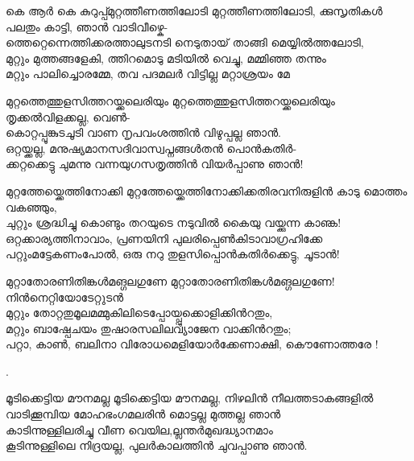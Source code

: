 \begin{enumerate}
\begin{slokam}{\VSr}{കെ ആർ കെ കുറുപ്പ്}{മുറ്റത്തീണത്തിലോടി}
മുറ്റത്തീണത്തിലോടി, ക്കുസൃതികള്‍ പലതും കാട്ടി, ഞാൻ വാടിവീഴ്കെ-\\
ത്തെറ്റെന്നെത്തിക്കരത്താലുടനടി നെടുതായ്‌ താങ്ങി മെയ്യിൽത്തലോടി,\\
മുറ്റും മുത്തങ്ങളേകി, ത്തിറമൊടു മടിയിൽ വെച്ചു, മമ്മിഞ്ഞ തന്നും\\
മറ്റും പാലിച്ചൊരമ്മേ, തവ പദമലർ വിട്ടില്ല മറ്റാശ്രയം മേ
\end{slokam}


\begin{slokam}{\VSv}{\VRV}{മുറ്റത്തെത്തുളസിത്തറയ്ക്കലെരിയും}
മുറ്റത്തെത്തുളസിത്തറയ്ക്കലെരിയും തൃക്കല്‍വിളക്കല്ല, വെണ്‍- \\
കൊറ്റപ്പൂങ്കുടചൂടി വാണ നൃപവംശത്തിന്‍ വിഴുപ്പല്ല ഞാന്‍. \\
ഒറ്റയ്ക്കല്ല, മനുഷ്യമാനസദിവാസ്വപ്നങ്ങള്‍തന്‍ പൊന്‍കതിര്‍- \\
ക്കറ്റക്കെട്ടു ചുമന്നു വന്നയുഗസതൃത്തിന്‍ വിയര്‍പ്പാണു ഞാന്‍! 
\end{slokam}



\begin{slokam}{\VSr}{\HM}{മുറ്റത്തേയ്ക്കെത്തിനോക്കി}
മുറ്റത്തേയ്ക്കെത്തിനോക്കിക്കതിരവനിരുളിൻ കാടു മൊത്തം വകഞ്ഞും,\\
ചുറ്റും ശ്രദ്ധിച്ചു കൊണ്ടും തറയുടെ നടുവിൽ കൈയു വയ്ക്കുന്ന കാണ്ക!\\
ഒറ്റക്കാര്യത്തിനാവാം, പ്രണയിനി പുലരിപ്പെൺകിടാവാഗ്രഹിക്കേ\\
പറ്റുംമട്ടേകണംപോൽ, ഒരു നറു തുളസിപ്പൊൻകതിർക്കെട്ടു, ചൂടാൻ!
\end{slokam}



\begin{slokam}{\VSv}{\Unk}{മുറ്റാതോരണിതിങ്കൾമങ്ഗലഗുണേ}
മുറ്റാതോരണിതിങ്കൾമങ്ഗലഗുണേ! നിൻനെറ്റിയോടേറ്റുടൻ\\
മുറ്റും തോറ്റതുമൂലമമ്മുകിലിടെപ്പോയ്പ്പുക്കൊളിക്കിൻറതും,\\
മറ്റും ബാഷ്പേചയം തുഷാരസലിലവ്യാജേന വാക്കിൻറതും;\\
പറ്റാ, കാൺ, ബലിനാ വിരോധമെളിയോർക്കേണാക്ഷി, കൌണോത്തരേ !
\end{slokam}


.


\begin{slokam}{\VSv}{\VRV}{മൂടിക്കെട്ടിയ മൗനമല്ല}
മൂടിക്കെട്ടിയ മൗനമല്ല, നിഴലിൻ നീലത്തടാകങ്ങളിൽ\\
വാടിക്കൂമ്പിയ മോഹഭംഗമലരിൻ മൊട്ടല്ല മുത്തല്ല ഞാൻ\\
കാടിന്നുള്ളിലരിച്ചു വീണ വെയില,ല്ലന്തർമുഖദ്ധ്യാനമാം\\
കൂടിന്നുള്ളിലെ നിദ്രയല്ല, പുലർകാലത്തിൻ ചുവപ്പാണു ഞാൻ.
\end{slokam}


\end{enumerate}
